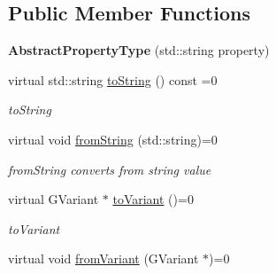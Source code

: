 \subsection*{Public Member Functions}
\begin{DoxyCompactItemize}
\item 
\hypertarget{classAbstractPropertyType_a2a525d57a943122e1cc709f738deb13e}{{\bfseries Abstract\+Property\+Type} (std\+::string property)}\label{classAbstractPropertyType_a2a525d57a943122e1cc709f738deb13e}

\item 
virtual std\+::string \hyperlink{classAbstractPropertyType_a4c359b2e7c3b0ede21c64ba2c90567aa}{to\+String} () const =0
\begin{DoxyCompactList}\small\item\em to\+String \end{DoxyCompactList}\item 
\hypertarget{classAbstractPropertyType_a9fae6e2ced72541b5e2bf321a1d193b0}{virtual void \hyperlink{classAbstractPropertyType_a9fae6e2ced72541b5e2bf321a1d193b0}{from\+String} (std\+::string)=0}\label{classAbstractPropertyType_a9fae6e2ced72541b5e2bf321a1d193b0}

\begin{DoxyCompactList}\small\item\em from\+String converts from string value \end{DoxyCompactList}\item 
virtual G\+Variant $\ast$ \hyperlink{classAbstractPropertyType_ae4c8025e310eb06916a28e0341f3356d}{to\+Variant} ()=0
\begin{DoxyCompactList}\small\item\em to\+Variant \end{DoxyCompactList}\item 
\hypertarget{classAbstractPropertyType_a3de5f842aa061f168438e67ca29c2685}{virtual void \hyperlink{classAbstractPropertyType_a3de5f842aa061f168438e67ca29c2685}{from\+Variant} (G\+Variant $\ast$)=0}\label{classAbstractPropertyType_a3de5f842aa061f168438e67ca29c2685}


\end{DoxyCompactItemize}
